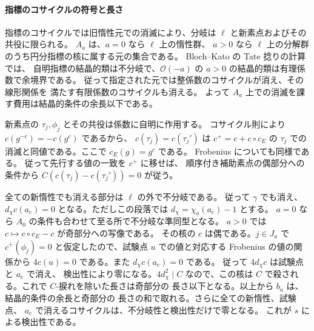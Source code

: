\paragraph{指標のコサイクルの符号と長さ}
指標のコサイクルでは旧惰性元での消滅により、分岐は
\(\ell\) と新素点およびその共役に限られる。
\(A_a\) は、\(a=0\) なら \(\ell\) 上の惰性群、
\(a>0\) なら \(\ell\) 上の分解群のうち円分指標の核に属する元の集合である。
Bloch--Kato の Tate 捻りの計算では、
自明指標の結晶的類は不分岐で、\(\mathcal O(-a)\) の
\(a>0\) の結晶的類は有理係数で余境界である。
従って指定された元では整係数のコサイクルが消え、その線形関係を
満たす有限係数のコサイクルも消える。
よって \(A_a\) 上での消滅を課す費用は結晶的条件の余長以下である。

新素点の \(\tau_j,\phi_j\) とその共役は係数に自明に作用する。
コサイクル則により \(c(g^{-c})=-c(g^c)\) であるから、
\(c(\tau_j)=c(\tau_j')\) は \(c^+=c+c\circ c_E\) の
\(\tau_j\) での消滅と同値である。ここで \(c_E(g)=g^c\) である。
Frobenius についても同様である。
従って先行する値の一致を \(c^+\) に移せば、
順序付き補助素点の偶部分への条件から
\(C(c(\tau_j)-c(\tau_j'))=0\) が従う。

全ての新惰性でも消える部分は \(\ell\) の外で不分岐である。
従って \(\gamma\) でも消え、
\(d_\chi c(a_{\mathrm c})=0\) となる。ただしこの段落では
\(d_\chi=\chi_a(a_{\mathrm c})-1\) とする。
\(a=0\) なら \(A_0\) の条件も合わせて至る所で不分岐な準同型となる。
\(a>0\) では \(c\mapsto c\circ c_E-c\) が奇部分への写像である。
その核の \(c\) は偶である。\(j\in J_a\) で \(c^+(\phi_j)=0\)
と仮定したので、試験点 \(u\) での値と対応する Frobenius の値の関係から
\(4c(u)=0\) である。また \(d_\chi c(a_{\mathrm c})=0\) である。
従って \(4d_\chi c\) は試験点と \(a_{\mathrm c}\) で消え、
検出性により零になる。\(4d_\chi^2\mid C\) なので、この核は
\(C\) で殺される。これで \(C\)-捩れを除いた長さは奇部分の
長さ以下となる。以上から \(b_a\) は、結晶的条件の余長と奇部分の
長さの和で取れる。さらに全ての新惰性、試験点、
\(a_{\mathrm c}\) で消えるコサイクルは、不分岐性と検出性だけで零となる。
これが \(s\) による検出性である。
